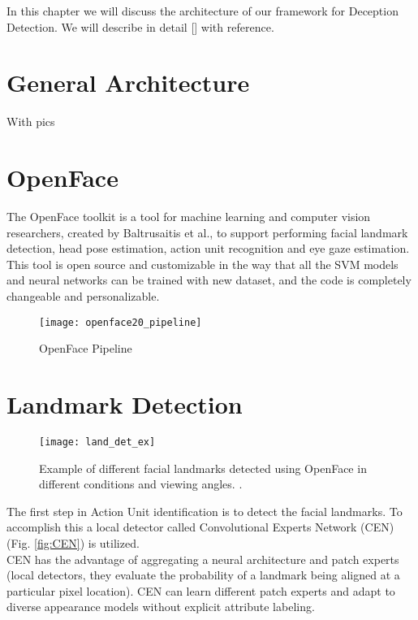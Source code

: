 In this chapter we will discuss the architecture of our framework for Deception Detection. We will describe in detail [] with reference.

\section{General Architecture}
With pics

\section{OpenFace} \label{OpenFace}
The OpenFace \cite{Baltru2018} toolkit is a tool for machine learning and computer vision researchers, created by Baltrusaitis et al., to support performing facial landmark detection, head pose estimation, action unit recognition and eye gaze estimation. \\
This tool is open source and customizable in the way that all the SVM models and neural networks can be trained with new dataset, and the code is completely changeable and personalizable.

\begin{figure}[H]
	\centering
	\texttt{[image: openface20\_pipeline]}
	\caption{OpenFace Pipeline \cite{Baltru2018}}
	\label{fig:openface20_pipeline}
\end{figure}

\section{Landmark Detection}

\begin{figure}[H]
	\centering
	\texttt{[image: land\_det\_ex]}
	\caption{Example of different facial landmarks detected using OpenFace in different conditions and viewing angles. \cite{Baltru2018}.}
	\label{fig:land_det_ex}
\end{figure}

The first step in Action Unit identification is to detect the facial landmarks. To accomplish this a local detector called Convolutional Experts Network (CEN) (Fig. \ref{fig:CEN}) is utilized. \\
CEN has the advantage of aggregating a neural architecture and patch experts (local detectors, they evaluate the probability of a landmark being aligned at a particular pixel location). CEN can learn different patch experts and adapt to diverse appearance models without explicit attribute labeling.

